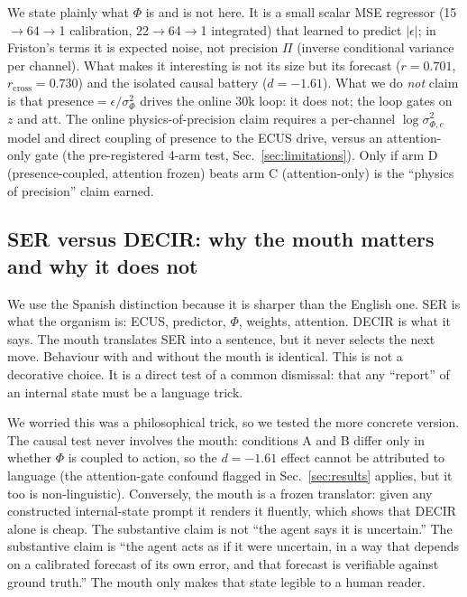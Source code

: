 \documentclass[11pt,a4paper]{article}
\begin{document}
We state plainly what $\Phi$ is and is not here. It is a small scalar MSE regressor (15$\rightarrow$64$\rightarrow$1 calibration, 22$\rightarrow$64$\rightarrow$1 integrated) that learned to predict $|\epsilon|$; in Friston's terms it is expected noise, not precision $\Pi$ (inverse conditional variance per channel). What makes it interesting is not its size but its forecast ($r=0.701$, $r_{\mathrm{cross}}=0.730$) and the isolated causal battery ($d=-1.61$). What we do \textit{not} claim is that $\mathrm{presence}=\epsilon/\sigma_\Phi^2$ drives the online 30k loop: it does not; the loop gates on $z$ and $\mathrm{att}$. The online physics-of-precision claim requires a per-channel $\log \sigma^2_{\Phi,c}$ model and direct coupling of $\mathrm{presence}$ to the ECUS drive, versus an attention-only gate (the pre-registered 4-arm test, Sec.~\ref{sec:limitations}). Only if arm D (presence-coupled, attention frozen) beats arm C (attention-only) is the ``physics of precision'' claim earned.

\subsection{SER versus DECIR: why the mouth matters and why it does not}

We use the Spanish distinction because it is sharper than the English one. SER is what the organism is: ECUS, predictor, $\Phi$, weights, attention. DECIR is what it says. The mouth translates SER into a sentence, but it never selects the next move. Behaviour with and without the mouth is identical. This is not a decorative choice. It is a direct test of a common dismissal: that any ``report'' of an internal state must be a language trick.

We worried this was a philosophical trick, so we tested the more concrete version. The causal test never involves the mouth: conditions A and B differ only in whether $\Phi$ is coupled to action, so the $d=-1.61$ effect cannot be attributed to language (the attention-gate confound flagged in Sec.~\ref{sec:results} applies, but it too is non-linguistic). Conversely, the mouth is a frozen translator: given any constructed internal-state prompt it renders it fluently, which shows that DECIR alone is cheap. The substantive claim is not ``the agent says it is uncertain.'' The substantive claim is ``the agent acts as if it were uncertain, in a way that depends on a calibrated forecast of its own error, and that forecast is verifiable against ground truth.'' The mouth only makes that state legible to a human reader.
\end{document}
